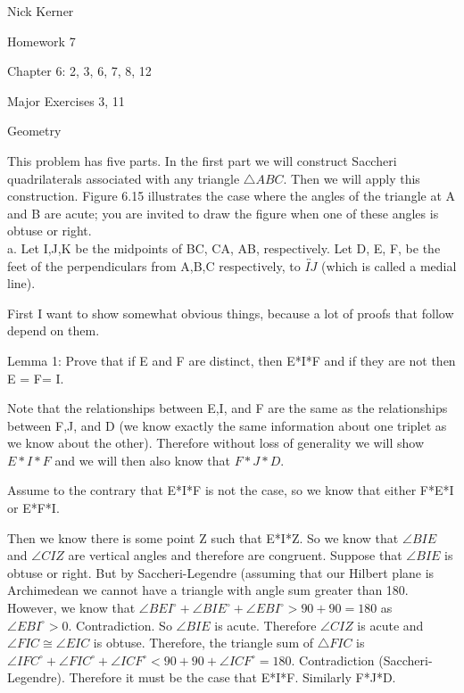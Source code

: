 \documentclass[12pt,letterpaper]{article}
\newcommand{\Proof}{\noindent {\bf Proof: }}
\newcommand{\pro}[1]{\noindent {\bf #1}}
\begin{document}
\begin{flushright}
Nick Kerner

Homework 7

Chapter 6: 2, 3, 6, 7, 8, 12

Major Exercises 3, 11

\end{flushright}
\begin{center}
\large{Geometry}\\
\end{center}

\pro{2 }This problem has five parts.  In the first part we will construct Saccheri quadrilaterals associated with any triangle $\triangle ABC$.  Then we will apply this construction.  Figure 6.15 illustrates the case where the angles of the triangle at A and B are acute;  you are invited to draw the figure when one of these angles is obtuse or right.  \\


a. Let I,J,K be the midpoints of BC, CA, AB, respectively.  Let D, E, F, be the feet of the perpendiculars from A,B,C respectively, to $\overleftrightarrow{IJ}$ (which is called a medial line).  


First I want to show somewhat obvious things, because a lot of proofs that follow depend on them.

Lemma 1: Prove that if E and F are distinct, then E*I*F  and if they are not then E = F= I.  

\Proof

Note that the relationships between E,I, and F are the same as the relationships between F,J, and D (we know exactly the same information about one triplet as we know about the other).  Therefore without loss of generality we will show $E*I*F$ and we will then also know that $F*J*D$.

Assume to the contrary that E*I*F is not the case, so we know that either F*E*I or E*F*I.  

Then we know there is some point Z such that E*I*Z.  So we know that $\angle BIE$ and $\angle CIZ$ are vertical angles and therefore are congruent.  Suppose that $\angle BIE $ is obtuse or right.  But by Saccheri-Legendre (assuming that our Hilbert plane is Archimedean we cannot have a triangle with angle sum greater than 180. However, we know that $\angle BEI^\circ + \angle BIE^\circ + \angle EBI^\circ > 90 + 90 = 180$ as $\angle EBI^\circ > 0$. Contradiction.  So $\angle BIE$ is acute.  Therefore $\angle CIZ$ is acute and $\angle FIC \cong \angle EIC$ is obtuse.  Therefore, the triangle sum of $\triangle FIC$ is $\angle IFC^\circ + \angle FIC^\circ + \angle ICF^\circ < 90 + 90 + \angle ICF^\circ = 180$.  Contradiction (Saccheri-Legendre). Therefore it must be the case that E*I*F.  Similarly F*J*D. 
\end{document}
